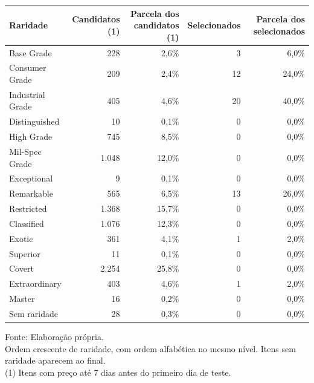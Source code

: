 \begingroup
\setlength{}
\setlength{}
\fontsize{8.0pt}{9.6pt}\selectfont

\setlength{\LTpost}{0mm}
\begin{longtable}{@{\extracolsep{\fill}}lrrrr}

\toprule
\textbf{Raridade} & \textbf{Candidatos} (1) & \textbf{Parcela dos candidatos} (1) & \textbf{Selecionados} & \textbf{Parcela dos selecionados} \\ 
\midrule\addlinespace[2.5pt]
Base Grade & 228 & 2,6\% & 3 & 6,0\% \\
Consumer Grade & 209 & 2,4\% & 12 & 24,0\% \\
Industrial Grade & 405 & 4,6\% & 20 & 40,0\% \\
Distinguished & 10 & 0,1\% & 0 & 0,0\% \\
High Grade & 745 & 8,5\% & 0 & 0,0\% \\
Mil-Spec Grade & 1.048 & 12,0\% & 0 & 0,0\% \\
Exceptional & 9 & 0,1\% & 0 & 0,0\% \\
Remarkable & 565 & 6,5\% & 13 & 26,0\% \\
Restricted & 1.368 & 15,7\% & 0 & 0,0\% \\
Classified & 1.076 & 12,3\% & 0 & 0,0\% \\
Exotic & 361 & 4,1\% & 1 & 2,0\% \\
Superior & 11 & 0,1\% & 0 & 0,0\% \\
Covert & 2.254 & 25,8\% & 0 & 0,0\% \\
Extraordinary & 403 & 4,6\% & 1 & 2,0\% \\
Master & 16 & 0,2\% & 0 & 0,0\% \\
Sem raridade & 28 & 0,3\% & 0 & 0,0\% \\
\bottomrule
\end{longtable}
\begin{minipage}{\linewidth}
Fonte: Elaboração própria.\\
Ordem crescente de raridade, com ordem alfabética no mesmo nível. Itens sem raridade aparecem ao final.\\
(1) Itens com preço até 7 dias antes do primeiro dia de teste.\\
\end{minipage}
\endgroup
